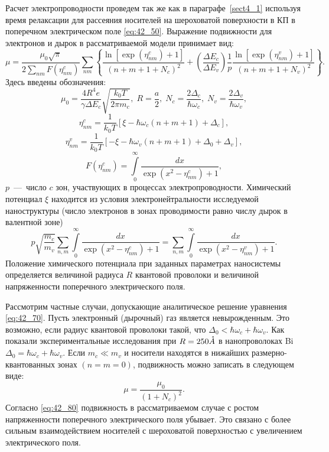 Расчет электропроводности проведем так же как в параграфе~\ref{sect4_1} используя время релаксации для рассеяния носителей на шероховатой поверхности в КП в поперечном электрическом поле \eqref{eq:42_50}. Выражение подвижности для электронов и дырок в рассматриваемой модели принимает вид:
\begin{equation} \label{eq:42_60}
	\mu =\frac{\mu_0\sqrt{\pi } }{2\sum_{nm} F(\eta_{nm}^c )} \sum_{nm}\left\{\frac{\ln \left[\exp \left(\eta _{nm}^c \right)+1\right]}{\left(n+m+1+N_c \right)^2 } +\left(\frac{\Delta E_c }{\Delta E_v } \right)\frac{1}{p} \frac{\ln \left[\exp \left(\eta_{nm}^v \right)+1\right]}{\left(n+m+1+N_v \right)^2 } \right\} .
\end{equation}
Здесь введены обозначения:
\[
	\mu_0 =\frac{4R^4 e}{\gamma \Delta E_c } \sqrt{\frac{k_0 T}{2\pi m_c } }, \;
	R=\frac{a}{2}, \;
	N_c =\frac{2\Delta_c }{\hbar \omega_c }, \;
	N_v =\frac{2\Delta_v }{\hbar \omega_v },
\]
\[
	\eta_{nm}^c =\frac{1}{k_0 T} \left[\xi -\hbar \omega_c \left(n+m+1\right)+\Delta_c \right],
\]
\[
	\eta_{nm}^v =\frac{1}{k_0 T} \left[-\xi -\hbar \omega_v \left(n+m+1\right)+\Delta_0 +\Delta_v \right],
\]
\[
	F(\eta_{nm}^c )=\int\limits_0^{\infty }{\frac{dx}{\exp \left(x^2 -\eta_{nm}^c \right)+1}}  ,
\]
$p$~---~число $c$ зон, участвующих в процессах электропроводности. Химический потенциал $\xi $ находится из условия электронейтральности исследуемой наноструктуры (число электронов в зонах проводимости равно числу дырок в валентной зоне)
\begin{equation} \label{eq:42_70}
	p\sqrt{\frac{m_c }{m_v } } \sum_{n,m}\int\limits_{0}^{\infty }{\frac{dx}{\exp \left(x^2 -\eta_{nm}^c \right)+1}}  =
	\sum_{n,m}\int\limits_0^{\infty}{\frac{dx}{\exp \left(x^2 -\eta_{nm}^v \right)+1}}.
\end{equation}
Положение химического потенциала при заданных параметрах наносистемы определяется величиной радиуса $R$ квантовой проволоки и величиной напряженности поперечного электрического поля.

Рассмотрим частные случаи, допускающие аналитическое решение уравнения \eqref{eq:42_70}. Пусть электронный (дырочный) газ является невырожденным. Это возможно, если радиус квантовой проволоки такой, что $\Delta_0 < \hbar \omega_c +\hbar \omega_v $. Как показали экспериментальные исследования \cite{Black2003a} при $R=250 \AA$ в нанопроволоках Bi $\Delta_0 =\hbar \omega_c +\hbar \omega_v $. Если $m_c \ll m_v $ и носители находятся в нижайших размерно-квантованных зонах $(n = m = 0)$, подвижность можно записать в следующем виде:
\begin{equation} \label{eq:42_80}
	\mu =\frac{\mu_0}{\left(1+N_c \right)^2 } .
\end{equation}
Согласно \eqref{eq:42_80} подвижность в рассматриваемом случае с ростом напряженности поперечного электрического поля убывает. Это связано с более сильным взаимодействием носителей с шероховатой поверхностью с увеличением электрического поля.

